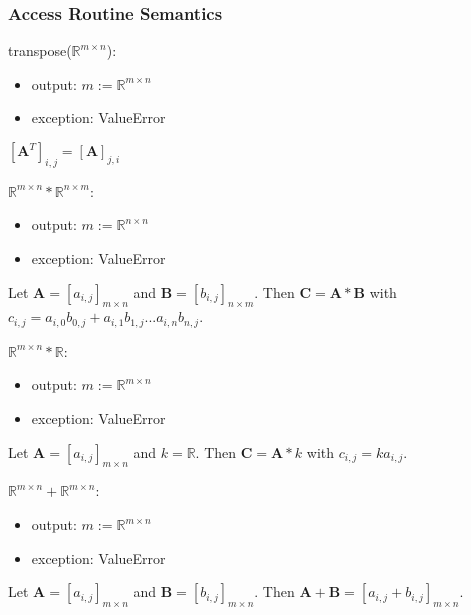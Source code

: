 \documentclass[12pt, titlepage]{article}
\begin{document}

\subsubsection{Access Routine Semantics}

\noindent transpose($\mathbb{R}^{m \times n}$):
\begin{itemize}
\item output: $m:=\mathbb{R}^{m \times n}$
\item exception: ValueError
\end{itemize}

$[\mathbf{A}^T]_{i,j} = [\mathbf{A}]_{j,i}$
\newline

\noindent $\mathbb{R}^{m \times n} * \mathbb{R}^{n \times m}$:
\begin{itemize}
\item output: $m:=\mathbb{R}^{n \times n}$
\item exception: ValueError
\end{itemize}

Let $\mathbf{A} = [a_{i,j}]_{m\times n}$ and $\mathbf{B} = [b_{i,j}]_{n\times m}$. Then $\mathbf{C}
= \mathbf{A} * \mathbf{B}$ with $c_{i,j} = a_{i,0} b_{0,j} + a_{i,1} b_{1,j} ...  a_{i,n}b_{n,j}$.
\newline

\noindent $\mathbb{R}^{m \times n} * \mathbb{R}$:
\begin{itemize}
\item output: $m:=\mathbb{R}^{m \times n}$
\item exception: ValueError
\end{itemize}

Let $\mathbf{A} = [a_{i,j}]_{m\times n}$ and $k = \mathbb{R}$. Then $\mathbf{C} = \mathbf{A} * k$
with $c_{i,j} = k a_{i,j}$.
\newline

\noindent $\mathbb{R}^{m \times n} + \mathbb{R}^{m \times n}$:
\begin{itemize}
\item output: $m:=\mathbb{R}^{m \times n}$
\item exception: ValueError
\end{itemize}

Let $\mathbf{A} = [a_{i,j}]_{m \times n}$ and $\mathbf{B} = [b_{i,j}]_{m \times n}$. Then
$\mathbf{A} + \mathbf{B} = [a_{i,j} + b_{i,j}]_{m \times n}$.
\newline
\end{document}
